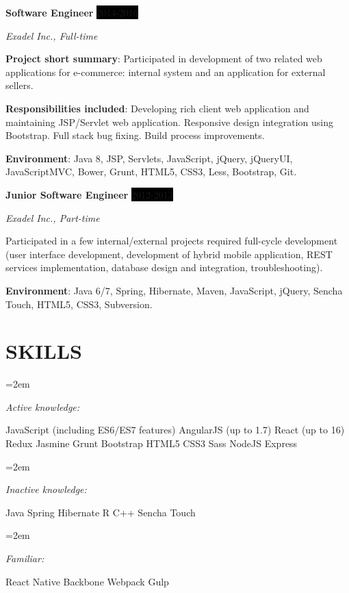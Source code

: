 \documentclass[paper=a4,fontsize=11pt]{scrartcl} %
\newlength{\spacebox}
\newcommand{\sepspace}{\vspace*{1em}}		%
\newcommand{\NewPart}[1]{\section*{\uppercase{#1}}}
\newcommand{\PersonalEntry}[2]{
		\noindent\hangindent=2em\hangafter=0 %
		\parbox{\spacebox}{        %
		\textit{#1}}		       %
		\hspace{1.5em} #2 \par}    %
\newcommand{\SkillsEntry}[2]{      %
		\noindent\hangindent=2em\hangafter=0 %
		\parbox{9em}{\textit{#1}}			   %
		\parbox{25em}{ \small #2 \normalsize \par} }
\newcommand{\EducationEntry}[4]{
		\noindent \textbf{#1} \hfill      %
		\colorbox{Black}{%
			\parbox{6em}{%
			\hfill\color{White}#2}} \par  %
		\noindent \textit{#3} \par        %
			\noindent\hangindent=2em\hangafter=0 \small #4 %
		\normalsize \par}
\newcommand{\WorkEntry}[4]{				  %
			\noindent \textbf{#1} \hfill      %
		\colorbox{Black}{\color{White}#2} \par  %
		\noindent \textit{#3} \par              %
		\hangafter=0 \small #4 %
		\normalsize \par}
\begin{document}
\WorkEntry{Software Engineer}{2014-2016}{Exadel Inc., Full-time}{
\textbf{Project short summary}: Participated in development of two related web applications for e-commerce: internal system and an application for external sellers.

\textbf{Responsibilities included}: Developing rich client web application and maintaining JSP/Servlet web application. Responsive design integration using Bootstrap. Full stack bug fixing. Build process improvements.

\textbf{Environment}: Java 8, JSP, Servlets, JavaScript, jQuery, jQueryUI, JavaScriptMVC, Bower, Grunt, HTML5, CSS3, Less, Bootstrap, Git.}
\sepspace

\pagebreak

\WorkEntry{Junior Software Engineer}{2012-2013}{Exadel Inc., Part-time}{Participated in a few internal/external projects required full-cycle development (user interface development, development of hybrid mobile application, REST services implementation, database design and integration, troubleshooting).

\textbf{Environment}: Java 6/7, Spring, Hibernate, Maven, JavaScript, jQuery, Sencha Touch, HTML5, CSS3, Subversion.
}

\NewPart{Skills}{}

\SkillsEntry{Active knowledge:}{JavaScript (including ES6/ES7 features) \textbullet{} AngularJS (up to 1.7) \textbullet{} React (up to 16) \textbullet{} Redux \textbullet{} Jasmine \textbullet{} Grunt \textbullet{} Bootstrap \textbullet{} HTML5 \textbullet{} CSS3 \textbullet Sass \textbullet{} NodeJS \textbullet{} Express}

\sepspace

\SkillsEntry{Inactive knowledge:}{Java \textbullet{} Spring \textbullet{} Hibernate \textbullet{} R \textbullet{} C++ \textbullet{} Sencha Touch }

\sepspace

\SkillsEntry{Familiar:}{React Native \textbullet{} Backbone \textbullet{} Webpack \textbullet{} Gulp \textbullet{}}
\end{document}
